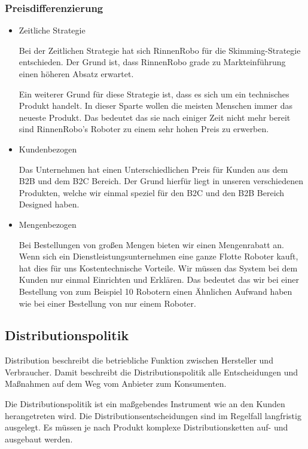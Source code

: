 \subsubsection{Preisdifferenzierung} \label{Preisdiff}
    \begin{itemize}
        \item Zeitliche Strategie
            
            Bei der Zeitlichen Strategie hat sich RinnenRobo für die Skimming-Strategie entschieden. Der Grund ist, dass 
            RinnenRobo grade zu Markteinführung einen höheren Absatz erwartet.

            Ein weiterer Grund für diese Strategie ist, dass es sich um ein technisches Produkt handelt. In dieser
            Sparte wollen die meisten Menschen immer das neueste Produkt. Das bedeutet das sie nach einiger Zeit 
            nicht mehr bereit sind RinnenRobo's Roboter zu einem sehr hohen Preis zu erwerben.

        \item Kundenbezogen

            Das Unternehmen hat einen Unterschiedlichen Preis für Kunden aus dem B2B und dem B2C Bereich. Der Grund 
            hierfür liegt in unseren verschiedenen Produkten, welche wir einmal speziel für den B2C und den B2B Bereich
            Designed haben.

        \item Mengenbezogen
        
            Bei Bestellungen von großen Mengen bieten wir einen Mengenrabatt an. Wenn sich ein 
            Dienstleistungsunternehmen eine ganze Flotte Roboter kauft, hat dies für uns Kostentechnische Vorteile.
            Wir müssen das System bei dem Kunden nur einmal Einrichten und Erklären. Das bedeutet das wir bei einer 
            Bestellung von zum Beispiel 10 Robotern einen Ähnlichen Aufwand haben wie bei einer Bestellung von nur einem 
            Roboter.
        \end{itemize}

        \subsection{Distributionspolitik} \label{distro}
        Distribution beschreibt die betriebliche Funktion zwischen Hersteller und Verbraucher. Damit beschreibt die
        Distributionspolitik alle Entscheidungen und Maßnahmen auf dem Weg vom Anbieter zum Konsumenten.
    
        \noindent
        Die Distributionspolitik ist ein maßgebendes Instrument wie an den Kunden herangetreten wird. Die
        Distributionsentscheidungen sind im Regelfall langfristig ausgelegt. Es müssen je nach Produkt komplexe
        Distributionsketten auf- und ausgebaut werden.
    
